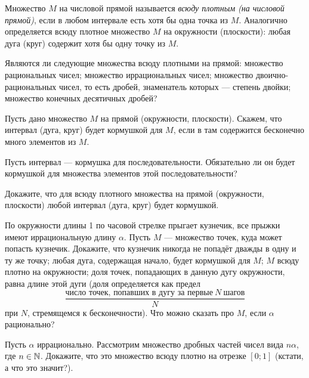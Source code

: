 \documentclass[a4paper,12pt]{article}
\begin{document}


Множество $M$ на числовой прямой называется \emph{всюду плотным (на числовой прямой)},
если в любом интервале есть хотя бы одна точка из $M$.
Аналогично определяется всюду плотное множество $M$ на окружности (плоскости): любая дуга (круг) содержит хотя бы одну точку из $M$.


Являются ли следующие множества всюду плотными на прямой:
множество рациональных чисел;
множество иррациональных чисел;
множество двоично-рациональных чисел, то есть дробей, знаменатель которых --- степень двойки;
множество конечных десятичных дробей?

Пусть дано множество $M$ на прямой (окружности, плоскости). Скажем, что интервал (дуга, круг) будет кормушкой для $M$, если в там содержится бесконечно много элементов из $M$.

Пусть интервал --- кормушка для последовательности. Обязательно ли он будет кормушкой для множества элементов этой последовательности?

Докажите, что для всюду плотного множества на прямой (окружности, плоскости) любой интервал (дуга, круг) будет кормушкой.

По окружности длины 1 по часовой стрелке прыгает кузнечик, все прыжки имеют иррациональную длину $\alpha$. Пусть $M$ --- множество точек, куда может попасть кузнечик. Докажите, что
 кузнечик никогда не попадёт дважды в одну и ту же точку;
 любая дуга, содержащая начало, будет кормушкой для $M$;
 $M$ всюду плотно на окружности;
 доля точек, попадающих в данную дугу окружности, равна длине этой дуги (доля определяется как предел
$$\frac{\textit{число\ точек,\ попавших\ в\ дугу\ за\ первые}\ N\ {\textit{шагов}}}{N}$$
при $N$, стремящемся к бесконечности).
 Что можно сказать про $M$, если $\alpha$ рационально?



Пусть $\alpha$ иррационально. Рассмотрим множество дробных частей чисел вида $n\alpha$, где $n\in\mathbb{N}$. Докажите, что это множество всюду плотно на отрезке $[0;1]$ (кстати, а что это значит?).
\end{document}
